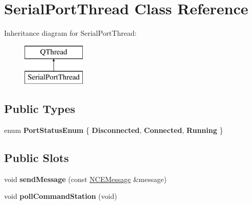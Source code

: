 \hypertarget{class_serial_port_thread}{}\section{Serial\+Port\+Thread Class Reference}
\label{class_serial_port_thread}
Inheritance diagram for Serial\+Port\+Thread\+:\begin{figure}[H]
\begin{center}
\leavevmode
\includegraphics[height=2.000000cm]{class_serial_port_thread}
\end{center}
\end{figure}
\subsection*{Public Types}
\begin{DoxyCompactItemize}
\item 
\mbox{\label{class_serial_port_thread_a2a5f36babceca39d2b8698c9a02d93e2}} 
enum {\bfseries Port\+Status\+Enum} \{ {\bfseries Disconnected}, 
{\bfseries Connected}, 
{\bfseries Running}
 \}
\end{DoxyCompactItemize}
\subsection*{Public Slots}
\begin{DoxyCompactItemize}
\item 
\mbox{\label{class_serial_port_thread_ae69ad77b0a8efd9652ddc249a61565f4}} 
void {\bfseries send\+Message} (const \hyperlink{class_n_c_e_message}{N\+C\+E\+Message} \&message)
\item 
\mbox{\label{class_serial_port_thread_a90726304c2d0fb01e1519b3ec606164c}} 
void {\bfseries poll\+Command\+Station} (void)
\end{DoxyCompactItemize}
